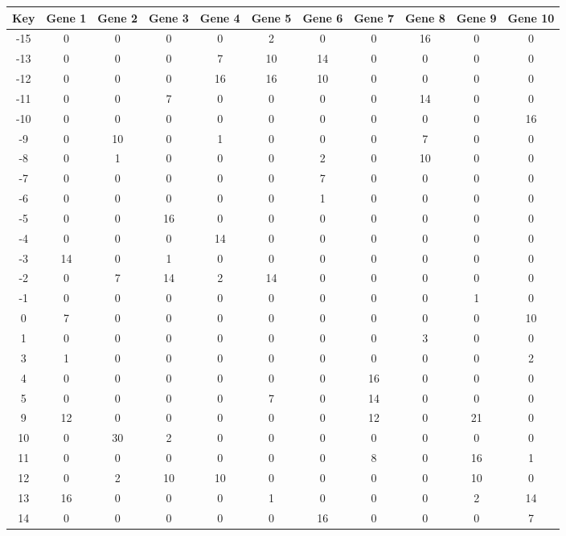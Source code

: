 \begin{tabular}{|c|c|c|c|c|c|c|c|c|c|c|}
\hline
Key & Gene 1 & Gene 2 & Gene 3 & Gene 4 & Gene 5 & Gene 6 & Gene 7 & Gene 8 & Gene 9 & Gene 10 \\
\hline
-15 & 0 & 0 & 0 & 0 & 2 & 0 & 0 & 16 & 0 & 0 \\
-13 & 0 & 0 & 0 & 7 & 10 & 14 & 0 & 0 & 0 & 0 \\
-12 & 0 & 0 & 0 & 16 & 16 & 10 & 0 & 0 & 0 & 0 \\
-11 & 0 & 0 & 7 & 0 & 0 & 0 & 0 & 14 & 0 & 0 \\
-10 & 0 & 0 & 0 & 0 & 0 & 0 & 0 & 0 & 0 & 16 \\
-9 & 0 & 10 & 0 & 1 & 0 & 0 & 0 & 7 & 0 & 0 \\
-8 & 0 & 1 & 0 & 0 & 0 & 2 & 0 & 10 & 0 & 0 \\
-7 & 0 & 0 & 0 & 0 & 0 & 7 & 0 & 0 & 0 & 0 \\
-6 & 0 & 0 & 0 & 0 & 0 & 1 & 0 & 0 & 0 & 0 \\
-5 & 0 & 0 & 16 & 0 & 0 & 0 & 0 & 0 & 0 & 0 \\
-4 & 0 & 0 & 0 & 14 & 0 & 0 & 0 & 0 & 0 & 0 \\
-3 & 14 & 0 & 1 & 0 & 0 & 0 & 0 & 0 & 0 & 0 \\
-2 & 0 & 7 & 14 & 2 & 14 & 0 & 0 & 0 & 0 & 0 \\
-1 & 0 & 0 & 0 & 0 & 0 & 0 & 0 & 0 & 1 & 0 \\
0 & 7 & 0 & 0 & 0 & 0 & 0 & 0 & 0 & 0 & 10 \\
1 & 0 & 0 & 0 & 0 & 0 & 0 & 0 & 3 & 0 & 0 \\
3 & 1 & 0 & 0 & 0 & 0 & 0 & 0 & 0 & 0 & 2 \\
4 & 0 & 0 & 0 & 0 & 0 & 0 & 16 & 0 & 0 & 0 \\
5 & 0 & 0 & 0 & 0 & 7 & 0 & 14 & 0 & 0 & 0 \\
9 & 12 & 0 & 0 & 0 & 0 & 0 & 12 & 0 & 21 & 0 \\
10 & 0 & 30 & 2 & 0 & 0 & 0 & 0 & 0 & 0 & 0 \\
11 & 0 & 0 & 0 & 0 & 0 & 0 & 8 & 0 & 16 & 1 \\
12 & 0 & 2 & 10 & 10 & 0 & 0 & 0 & 0 & 10 & 0 \\
13 & 16 & 0 & 0 & 0 & 1 & 0 & 0 & 0 & 2 & 14 \\
14 & 0 & 0 & 0 & 0 & 0 & 16 & 0 & 0 & 0 & 7 \\
\hline
\end{tabular}
